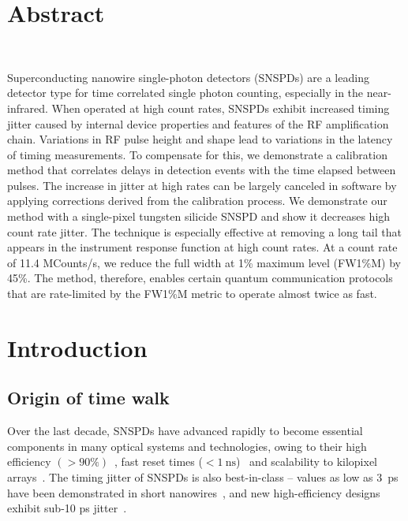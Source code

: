 \documentclass[11pt]{caltech_thesis} %
\begin{document}
\hypertarget{abstract-1}{%
\section{Abstract}\label{abstract-1}}

~~~~~

Superconducting nanowire single-photon detectors (SNSPDs) are a leading detector type for time correlated single photon counting, especially in the near-infrared. When operated at high count rates, SNSPDs exhibit increased timing jitter caused by internal device properties and features of the RF amplification chain. Variations in RF pulse height and shape lead to variations in the latency of timing measurements. To compensate for this, we demonstrate a calibration method that correlates delays in detection events with the time elapsed between pulses. The increase in jitter at high rates can be largely canceled in software by applying corrections derived from the calibration process. We demonstrate our method with a single-pixel tungsten silicide SNSPD and show it decreases high count rate jitter. The technique is especially effective at removing a long tail that appears in the instrument response function at high count rates. At a count rate of 11.4 MCounts/s, we reduce the full width at 1\% maximum level (FW1\%M) by 45\%. The method, therefore, enables certain quantum communication protocols that are rate-limited by the FW1\%M metric to operate almost twice as fast.

\hypertarget{introduction-2}{%
\section{Introduction}\label{introduction-2}}

\hypertarget{origin-of-time-walk}{%
\subsection{Origin of time walk}\label{origin-of-time-walk}}

Over the last decade, SNSPDs have advanced rapidly to become essential components in many optical systems and technologies, owing to their high efficiency $(>90\%)$~\autocite{99.5_Chang_2021,reddy2020superconducting}, fast reset times ($< 1~\mathrm{ns}$)~\autocite{Vetter2016Cavity} and scalability to kilopixel arrays~\autocite{Wollman2019}. The timing jitter of SNSPDs is also best-in-class -- values as low as 3~ps have been demonstrated in short nanowires~\autocite{Korzh2020}, and new high-efficiency designs exhibit sub-10 ps jitter~\autocite{EsmaeilZadeh2020,Colangelo2021}.
\end{document}
